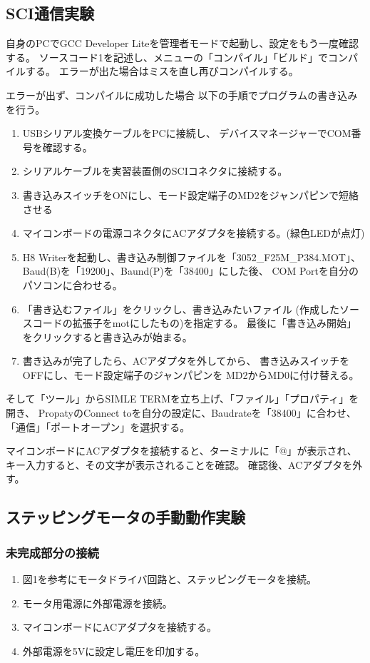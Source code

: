 \documentclass[10pt,a4paper]{jarticle}
\begin{document}
\subsection{SCI通信実験}
自身のPCでGCC Developer Liteを管理者モードで起動し、設定をもう一度確認する。
ソースコード1を記述し、メニューの「コンパイル」「ビルド」でコンパイルする。
エラーが出た場合はミスを直し再びコンパイルする。\par
エラーが出ず、コンパイルに成功した場合
以下の手順でプログラムの書き込みを行う。\par
\begin{enumerate}
 \item USBシリアル変換ケーブルをPCに接続し、
 デバイスマネージャーでCOM番号を確認する。
 \item シリアルケーブルを実習装置側のSCIコネクタに接続する。
 \item 書き込みスイッチをONにし、モード設定端子のMD2をジャンパピンで短絡させる
 \item マイコンボードの電源コネクタにACアダプタを接続する。(緑色LEDが点灯)
 \item H8 Writerを起動し、書き込み制御ファイルを「3052\_F25M\_P384.MOT」、
 Baud(B)を「19200」、Baund(P)を「38400」にした後、
 COM Portを自分のパソコンに合わせる。
 \item 「書き込むファイル」をクリックし、書き込みたいファイル
 (作成したソースコードの拡張子をmotにしたもの)を指定する。
 最後に「書き込み開始」をクリックすると書き込みが始まる。
 \item 書き込みが完了したら、ACアダプタを外してから、
 書き込みスイッチをOFFにし、モード設定端子のジャンパピンを
 MD2からMD0に付け替える。
\end{enumerate}
そして「ツール」からSIMLE TERMを立ち上げ、「ファイル」「プロパティ」を開き、
PropatyのConnect toを自分の設定に、Baudrateを「38400」に合わせ、
「通信」「ポートオープン」を選択する。\par
マイコンボードにACアダプタを接続すると、ターミナルに「@」が表示され、
キー入力すると、その文字が表示されることを確認。
確認後、ACアダプタを外す。
\subsection{ステッピングモータの手動動作実験}
\subsubsection{未完成部分の接続}
\begin{enumerate}
 \item 図1を参考にモータドライバ回路と、ステッピングモータを接続。
 \item モータ用電源に外部電源を接続。
 \item マイコンボードにACアダプタを接続する。
 \item 外部電源を5Vに設定し電圧を印加する。
\end{enumerate}
\end{document}

